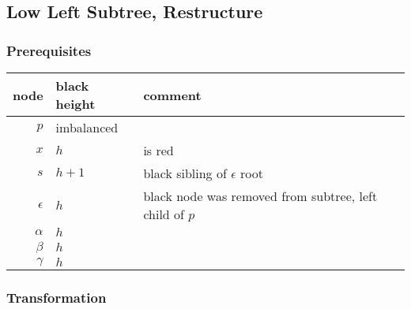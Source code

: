 \documentclass[a4paper,10pt,twoside]{article}
\begin{document}
\subsection{Low Left Subtree, Restructure}

\subsubsection{Prerequisites}

\begin{center}
\begin{tabular}{|r||l|l|}
\hline
node		&	black height	&	comment	\\
\hline
\hline
$p$		&	imbalanced	&		\\\hline
$x$		&	$h$	&	is red	\\\hline
$s$		&	$h+1$	&	black sibling of $\epsilon$ root	\\\hline
$\epsilon$	&	$h$	&	black node was removed from subtree, left child of $p$	\\\hline
$\alpha$	&	$h$	&		\\\hline
$\beta$		&	$h$	&		\\\hline
$\gamma$	&	$h$	&		\\\hline
\end{tabular}
\end{center}

\begin{center}
\end{center}

\subsubsection{Transformation}
\end{document}
